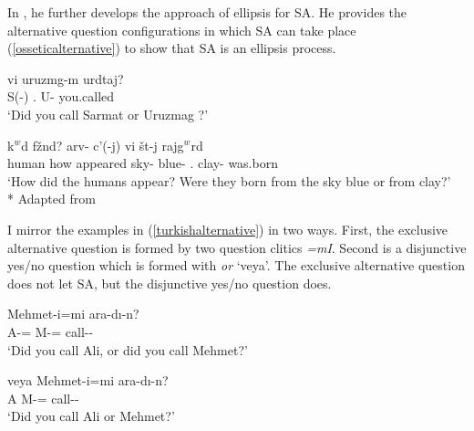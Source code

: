 In \cite{erschler2018suspended}, he further develops the approach of ellipsis for SA. He provides the alternative question configurations in which SA can take place (\ref{osseticalternative}) to show that SA is an ellipsis process.

\begin{exe}
    \ex \label{osseticalternative}
    \begin{xlist}
        \ex {} {\textturna vi} {uruzm\textturna g-m\textturna} {\textdzlig urdtaj?} \\ 
        S(-{\All}) {\Or}.{\Q} U-{\All} you.called \\ 
        \glt `Did you call Sarmat or Uruzmag ?'
        
        \ex {} {k$^w$\textschwa d} {f\textturna\v{z}\textschwa nd?} {arv-\textschwa} {c'\textturna\textinvscr(-\textturna j)} {\textturna vi} {\v{s}\textschwa\textdyoghlig\textschwa t-\textturna j} {rajg$^w$\textschwa rd} \\ 
        human how appeared sky-{\Obl} blue-{\Abl} {\Or}.{\Q} clay-{\Abl} was.born \\
        \glt `How did the humans appear? Were they born from the sky blue or from clay?'\\*
        \hfill Adapted from \cite{erschler2018suspended}
    \end{xlist}
\end{exe}

I mirror the examples in (\ref{turkishalternative}) in two ways. First, the exclusive alternative question is formed by two question clitics \textit{=mI}. Second is a disjunctive yes/no question which is formed with \textit{or} `veya'. The exclusive alternative question does not let SA, but the disjunctive yes/no question does.

\begin{exe}
    \ex \label{turkishalternative}
    \begin{xlist}
    \ex {} {Mehmet-i=mi} {ara-dı-n?} \\ 
    A-{\Acc}={\Q} M-{\Acc}={\Q} call-{\Pst}-{\Ssg} \\
    \glt `Did you call Ali, or did you call Mehmet?'
    
    \ex {} {veya} {Mehmet-i=mi} {ara-dı-n?} \\
    A {\Or} M-{\Acc}={\Q} call-{\Pst}-{\Ssg} \\
    \glt `Did you call Ali or Mehmet?'
    \end{xlist}
\end{exe}

